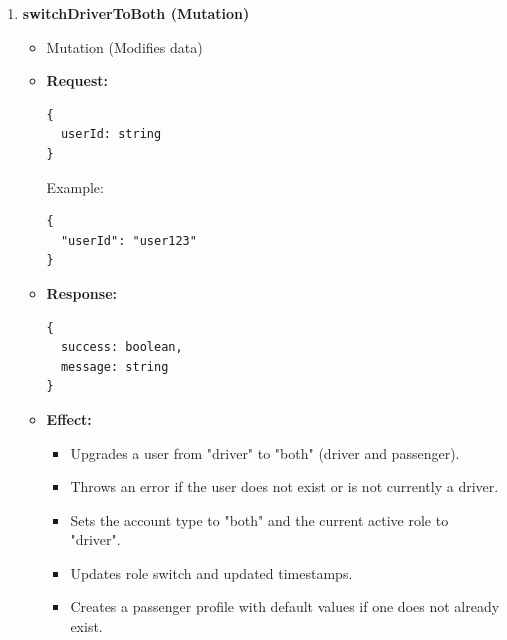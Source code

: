 \documentclass[a4paper,12pt]{article}
\begin{document}
\begin{enumerate}
\item \textbf{switchDriverToBoth (Mutation)}
    \begin{itemize}
      \item Mutation (Modifies data)
      \item \textbf{Request:}
      \begin{verbatim}
{
  userId: string
}
      \end{verbatim}
      Example:
      \begin{verbatim}
{
  "userId": "user123"
}
      \end{verbatim}
      \item \textbf{Response:}
      \begin{verbatim}
{
  success: boolean,
  message: string
}
      \end{verbatim}
      \item \textbf{Effect:}
      \begin{itemize}
        \item Upgrades a user from "driver" to "both" (driver and passenger).
        \item Throws an error if the user does not exist or is not currently a driver.
        \item Sets the account type to "both" and the current active role to "driver".
        \item Updates role switch and updated timestamps.
        \item Creates a passenger profile with default values if one does not already exist.
      \end{itemize}
    \end{itemize}


\end{enumerate}
\end{document}
